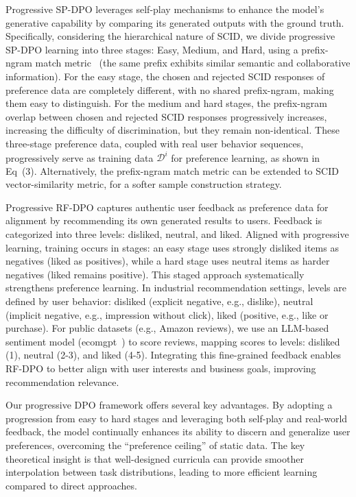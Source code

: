 \documentclass[letterpaper]{article} %
\begin{document}
%
Progressive SP-DPO leverages self-play mechanisms to enhance the model's generative capability by comparing its generated outputs with the ground truth. Specifically, considering the hierarchical nature of SCID, we divide progressive SP-DPO learning into three stages: Easy, Medium, and Hard, using a prefix-ngram match metric~\cite{PNM} (the same prefix exhibits similar semantic and collaborative information). For the easy stage, the chosen and rejected SCID responses of preference data are completely different, with no shared prefix-ngram, making them easy to distinguish. 
%
For the medium and hard stages, the prefix-ngram overlap between chosen and rejected SCID responses progressively increases, increasing the difficulty of discrimination, but they remain non-identical.
These three-stage preference data, coupled with real user behavior sequences, progressively serve as training data $\mathcal{D}^i$ for preference learning, as shown in Eq~(3). Alternatively, the prefix-ngram match metric can be extended to SCID vector-similarity metric, for a softer sample construction strategy.
%

%
Progressive RF-DPO captures authentic user feedback as preference data for alignment by recommending its own generated results to users. Feedback is categorized into three levels: disliked, neutral, and liked. Aligned with progressive learning, training occurs in stages: an easy stage uses strongly disliked items as negatives (liked as positives), while a hard stage uses neutral items as harder negatives (liked remains positive). This staged approach systematically strengthens preference learning. In industrial recommendation settings, levels are defined by user behavior: disliked (explicit negative, e.g., dislike), neutral (implicit negative, e.g., impression without click), liked (positive, e.g., like or purchase). For public datasets (e.g., Amazon reviews), we use an LLM-based sentiment model (ecomgpt~\cite{ecomgpt}) to score reviews, mapping scores to levels: disliked (1), neutral (2-3), and liked (4-5). Integrating this fine-grained feedback enables RF-DPO to better align with user interests and business goals, improving recommendation relevance.
%

%
Our progressive DPO framework offers several key advantages. By adopting a progression from easy to hard stages and leveraging both self-play and real-world feedback, the model continually enhances its ability to discern and generalize user preferences, overcoming the “preference ceiling” of static data. The key theoretical insight is that well-designed curricula can provide smoother interpolation between task distributions, leading to more efficient learning compared to direct approaches.
%
\end{document}
